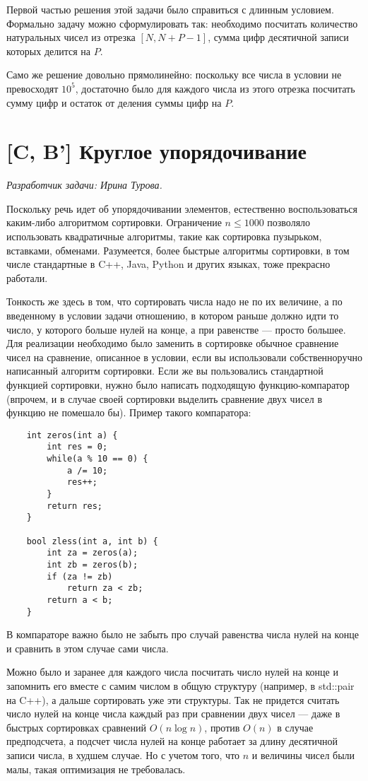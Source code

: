 \documentclass[12pt]{article}
\theoremstyle{definition}
\begin{document}
Первой частью решения этой задачи было справиться с длинным условием.
Формально задачу можно сформулировать так: необходимо посчитать количество натуральных
чисел из отрезка $[N, N + P - 1]$, сумма цифр десятичной записи которых делится на $P$.

Само же решение довольно прямолинейно: поскольку все числа в условии не превосходят $10^5$,
достаточно было для каждого числа из этого отрезка посчитать сумму цифр
и остаток от деления суммы цифр на $P$.

\section{[C, B'] Круглое упорядочивание}
\textit{Разработчик задачи: Ирина Турова.}

Поскольку речь идет об упорядочивании элементов, естественно воспользоваться
каким-либо алгоритмом сортировки. Ограничение $n \le 1000$ позволяло использовать
квадратичные алгоритмы, такие как сортировка пузырьком, вставками, обменами. Разумеется,
более быстрые алгоритмы сортировки, в том числе стандартные в C++, Java, Python и других языках, тоже прекрасно работали.

Тонкость же здесь в том, что сортировать числа надо не по их величине, а по введенному в
условии задачи отношению, в котором раньше должно идти то число, у которого больше нулей
на конце, а при равенстве --- просто большее. Для реализации необходимо было
заменить в сортировке обычное сравнение чисел на сравнение, описанное в условии,
если вы использовали собственноручно написанный алгоритм сортировки. Если же вы
пользовались стандартной функцией сортировки, нужно было написать
подходящую функцию-компаратор (впрочем, и в случае своей сортировки выделить сравнение
двух чисел в функцию не помешало бы). Пример такого компаратора:
\begin{lstlisting}
    int zeros(int a) {
        int res = 0;
        while(a % 10 == 0) {
            a /= 10;
            res++;
        }
        return res;
    }

    bool zless(int a, int b) {
        int za = zeros(a);
        int zb = zeros(b);
        if (za != zb)
            return za < zb;
        return a < b;
    }
\end{lstlisting}

В компараторе важно было не забыть про случай равенства числа нулей на конце и сравнить
в этом случае сами числа.

Можно было и заранее для каждого числа посчитать число нулей на конце и запомнить его
вместе с самим числом в общую структуру (например, в std::pair на C++), а дальше
сортировать уже эти структуры. Так не придется считать число нулей на конце числа
каждый раз при сравнении двух чисел --- даже в быстрых сортировках сравнений $O(n \log n)$, против $O(n)$ в случае предподсчета, а подсчет числа нулей на конце работает за
длину десятичной записи числа, в худшем случае. Но с учетом того, что $n$ и величины чисел
были малы, такая оптимизация не требовалась.
\end{document}
